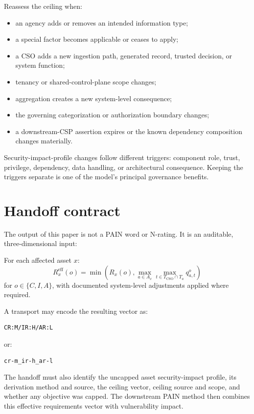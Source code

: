 \documentclass[11pt]{article}
\begin{document}
Reassess the ceiling when:

\begin{itemize}[leftmargin=1.5em]
\item an agency adds or removes an intended information type;
\item a special factor becomes applicable or ceases to apply;
\item a CSO adds a new ingestion path, generated record, trusted decision, or
  system function;
\item tenancy or shared-control-plane scope changes;
\item aggregation creates a new system-level consequence;
\item the governing categorization or authorization boundary changes;
\item a downstream-CSP assertion expires or the known dependency composition changes
  materially.
\end{itemize}

Security-impact-profile changes follow different triggers: component role, trust,
privilege, dependency, data handling, or architectural consequence. Keeping the
triggers separate is one of the model's principal governance benefits.

\section{Handoff contract}

The output of this paper is not a PAIN word or N-rating. It is an auditable,
three-dimensional input:

\begin{modelbox}
For each affected asset $x$:
\[
\boxed{
R_x^{\mathrm{eff}}(o)
=\min\left(
R_x(o),
\max_{a\in A_x}
\max_{t\in T_{\mathrm{CSO}}\cap T_a}
q_{a,t}^o
\right)
}
\]
for $o\in\{C,I,A\}$, with documented system-level adjustments applied where
required.
\end{modelbox}

A transport may encode the resulting vector as:

\begin{verbatim}
CR:M/IR:H/AR:L
\end{verbatim}

or:

\begin{verbatim}
cr-m_ir-h_ar-l
\end{verbatim}

The handoff must also identify the uncapped asset security-impact profile, its
derivation method and source, the ceiling vector, ceiling source and scope, and
whether any objective was capped. The downstream PAIN method then combines this
effective requirements vector with vulnerability impact.
\end{document}
